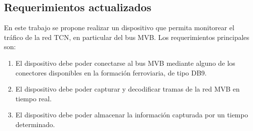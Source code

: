 \subsection{Requerimientos actualizados}

\label{sec:requerimientos}

En este trabajo se propone realizar un dispositivo que permita monitorear el tráfico de la red TCN, en particular del bus MVB. Los requerimientos principales son:

\begin{enumerate}
\item El dispositivo debe poder conectarse al bus MVB mediante alguno de los conectores disponibles en la formación ferroviaria, de tipo DB9.
\item El dispositivo debe poder capturar y decodificar tramas de la red MVB en tiempo real.
\item El dispositivo debe poder almacenar la información capturada por un tiempo determinado.
\end{enumerate}
